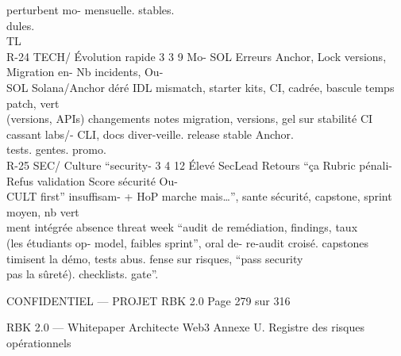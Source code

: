 \documentclass[12pt,landscape,a4paper]{article}
\newenvironment{confidential}
{\begin{tcolorbox}[
    colback=rbkred!5!white,
    colframe=rbkred!75!black,
    title=CONFIDENTIEL,
    fonttitle=\bfseries\color{white},
    coltitle=rbkred!75!black,
    breakable,
    enhanced,
    frame hidden,
    borderline west={2pt}{0pt}{rbkred!75!black}
]}
{\end{tcolorbox}}
\begin{document}
perturbent  mo-                                             mensuelle.        stables.\\
dules.\\
TL\\
R-24   TECH/     Évolution rapide 3 3 9      Mo- SOL        Erreurs Anchor, Lock     versions, Migration    en- Nb incidents, Ou-\\
SOL       Solana/Anchor               déré           IDL    mismatch, starter kits, CI, cadrée, bascule temps patch, vert\\
(versions, APIs)                           changements      notes migration, versions, gel sur stabilité CI\\
cassant    labs/-                          CLI, docs diver-veille.            release   stable Anchor.\\
tests.                                     gentes.                            promo.\\
R-25   SEC/      Culture “security- 3 4 12 Élevé SecLead Retours         “ça Rubric      pénali- Refus validation Score sécurité Ou-\\
CULT      first” insuffisam-              + HoP marche mais…”, sante           sécurité, capstone, sprint moyen,      nb vert\\
ment      intégrée                      absence threat week             “audit de remédiation, findings, taux\\
(les étudiants op-                      model,      faibles sprint”, oral de- re-audit croisé. capstones\\
timisent la démo,                       tests abus.         fense sur risques,                  “pass security\\
pas la sûreté).                                             checklists.                          gate”.\\
\vspace{0.5em}
\vspace{0.5em}
\vspace{0.5em}
\vspace{0.5em}
\begin{confidential}CONFIDENTIEL — PROJET RBK 2.0                                                                                           Page 279 sur 316\end{confidential}
RBK 2.0 — Whitepaper Architecte Web3                                                                            Annexe U. Registre des risques opérationnels\\
\vspace{0.5em}
\end{document}
